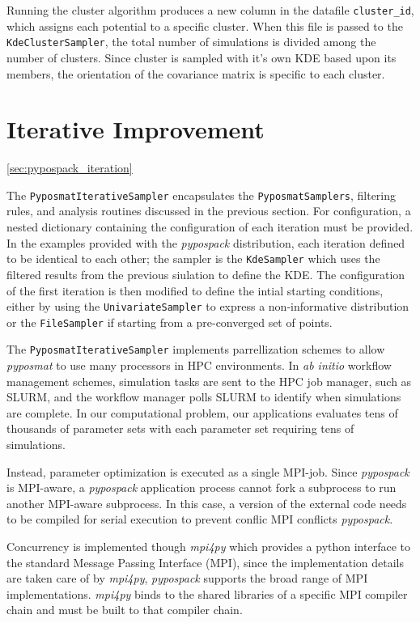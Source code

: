 Running the cluster algorithm produces a new column in the datafile \verb|cluster_id|, which assigns each potential to a specific cluster.  When this file is passed to the \verb|KdeClusterSampler|, the total number of simulations is divided among the number of clusters.  Since cluster is sampled with it's own KDE based upon its members, the orientation of the covariance matrix is specific to each cluster.

\section{Iterative Improvement}
\ref{sec:pypospack_iteration}

The \verb|PyposmatIterativeSampler| encapsulates the \verb|PyposmatSamplers|, filtering rules, and analysis routines discussed in the previous section.  For configuration, a nested dictionary containing the configuration of each iteration must be provided.  In the examples provided with the \emph{pypospack} distribution, each iteration defined to be identical to each other; the sampler is the \verb|KdeSampler| which uses the filtered results from the previous siulation to define the KDE.  The configuration of the first iteration is then modified to define the intial starting conditions, either by using the \verb|UnivariateSampler| to express a non-informative distribution or the \verb|FileSampler| if starting from a pre-converged set of points.

The \verb|PyposmatIterativeSampler| implements parrellization schemes to allow \emph{pyposmat} to use many processors in HPC environments.  In \emph{ab initio} workflow management schemes, simulation tasks are sent to the HPC job manager, such as SLURM, and the workflow manager polls SLURM to identify when simulations are complete.  In our computational problem, our applications evaluates tens of thousands of parameter sets with each parameter set requiring tens of simulations.

Instead, parameter optimization is executed as a single MPI-job.  Since \emph{pypospack} is MPI-aware, a \emph{pypospack} application process cannot fork a subprocess to run another MPI-aware subprocess.  In this case, a version of the external code needs to be compiled for serial execution to prevent conflic MPI conflicts \emph{pypospack}.

Concurrency is implemented though \emph{mpi4py} which provides a python interface to the standard Message Passing Interface (MPI), since the implementation details are taken care of by \emph{mpi4py}, \emph{pypospack} supports the broad range of MPI implementations.   \emph{mpi4py} binds to the shared libraries of a specific MPI compiler chain and must be built to that compiler chain.


